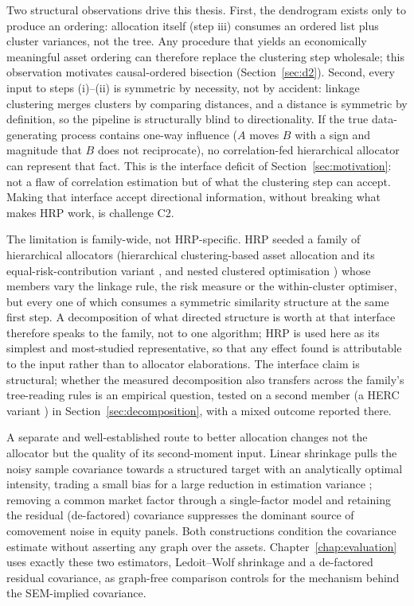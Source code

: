 Two structural observations drive this thesis. First, the dendrogram
exists only to produce an ordering: allocation itself (step iii) consumes an
ordered list plus cluster variances, not the tree. Any procedure that yields
an economically meaningful asset ordering can therefore replace the
clustering step wholesale; this observation motivates causal-ordered
bisection (Section~\ref{sec:d2}). Second, every input to steps
(i)--(ii) is symmetric by necessity, not by accident: linkage clustering
merges clusters by comparing distances, and a distance is symmetric by
definition, so the pipeline is structurally blind to directionality. If the
true data-generating process contains one-way influence ($A$ moves $B$ with
a sign and magnitude that $B$ does not reciprocate), no correlation-fed
hierarchical allocator can represent that fact. This is the interface deficit of
Section~\ref{sec:motivation}: not a flaw of correlation estimation but of
what the clustering step can accept. Making that interface accept directional
information, without breaking what makes HRP work, is challenge C2.

The limitation is family-wide, not HRP-specific. HRP seeded a family of
hierarchical allocators (hierarchical clustering-based asset allocation
and its equal-risk-contribution variant \cite{raffinot2017hierarchical},
and nested clustered optimisation \cite{lopezdeprado2020mlam}) whose members
vary the linkage rule, the risk measure or the within-cluster optimiser,
but every one of which consumes a symmetric similarity structure at the
same first step. A decomposition of what directed structure is worth at
that interface therefore speaks to the family, not to one algorithm; HRP
is used here as its simplest and most-studied representative, so that any
effect found is attributable to the input rather than to allocator
elaborations. The interface claim is structural; whether the
measured decomposition also transfers across the family's
tree-reading rules is an empirical question, tested on a second member
(a HERC variant \cite{raffinot2018herc}) in
Section~\ref{sec:decomposition}, with a mixed outcome reported there.

A separate and well-established route to better allocation changes not the
allocator but the quality of its second-moment input. Linear shrinkage pulls
the noisy sample covariance towards a structured target with an analytically
optimal intensity, trading a small bias for a large reduction in estimation
variance \cite{ledoitwolf2004}; removing a common market factor through a
single-factor model and retaining the residual (de-factored) covariance
suppresses the dominant source of comovement noise in equity panels. Both
constructions condition the covariance estimate without asserting any graph
over the assets. Chapter~\ref{chap:evaluation} uses exactly these two
estimators, Ledoit--Wolf shrinkage and a de-factored residual covariance, as
graph-free comparison controls for the mechanism behind the SEM-implied
covariance.

